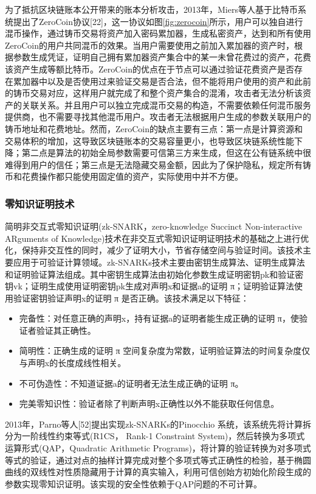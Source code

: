 为了抵抗区块链账本公开带来的账本分析攻击，2013年，Miers等人基于比特币系统提出了ZeroCoin协议[22]，这一协议如图\ref{fig:zerocoin}所示，用户可以独自进行混币操作，通过铸币交易将资产加入密码累加器，生成私密资产，达到和所有使用ZeroCoin的用户共同混币的效果。当用户需要使用之前加入累加器的资产时，根据参数生成凭证，证明自己拥有累加器资产集合中的某一未曾花费过的资产，花费该资产生成等额比特币。ZeroCoin的优点在于节点可以通过验证花费资产是否存在累加器中以及是否使用过来验证交易是否合法，但不能将用户使用的资产和此前的铸币交易对应，这样用户就完成了和整个资产集合的混淆，攻击者无法分析该资产的关联关系。并且用户可以独立完成混币交易的构造，不需要依赖任何混币服务提供商，也不需要寻找其他混币用户。攻击者无法根据用户生成的参数关联用户的铸币地址和花费地址。然而，ZeroCoin的缺点主要有三点：第一点是计算资源和交易体积的增加，这导致区块链账本的交易容量更小，也导致区块链系统性能下降；第二点是算法的初始全局参数需要可信第三方来生成，但这在公有链系统中很难得到用户的信任；第三点是无法隐藏交易金额，因此为了保护隐私，规定所有铸币和花费操作都只能使用固定值的资产，实际使用中并不方便。

\subsubsection{零知识证明技术}

简明非交互式零知识证明(zk-SNARK，zero-knowledge Succinct Non-interactive ARguments of Knowledge)技术在非交互式零知识证明证明技术的基础之上进行优化，保持非交互性的同时，减少了证明大小，节省存储空间与验证时间。该技术主要应用于可验证计算领域。zk-SNARKs技术主要由密钥生成算法、证明生成算法和证明验证算法组成。其中密钥生成算法由初始化参数生成证明密钥pk和验证密钥vk；证明生成使用证明密钥pk生成对声明x和证据a的证明 π；证明验证算法使用验证密钥验证声明x的证明 π 是否正确。该技术满足以下特征：

\begin{itemize}
	\item 完备性：对任意正确的声明x，持有证据a的证明者能生成正确的证明 π，使验证者验证其正确性。
	\item 简明性：正确生成的证明 π 空间复杂度为常数，证明验证算法的时间复杂度仅与声明x的长度成线性相关。
	\item 不可伪造性：不知道证据a的证明者无法生成正确的证明 π。
	\item 完美零知识性：验证者除了判断声明x正确性以外不能获取任何信息。
\end{itemize}

2013年，Parno等人[52]提出实现zk-SNARKs的Pinocchio 系统，该系统先将计算拆分为一阶线性约束等式(R1CS， Rank-1 Constraint System)，然后转换为多项式运算形式(QAP，Quadratic Arithmetic Programs)，将计算的验证转换为对多项式等式的验证，通过对点的抽样计算完成对整个多项式等式正确性的检验，基于椭圆曲线的双线性对性质隐藏用于计算的真实输入，利用可信创始方初始化阶段生成的参数实现零知识证明。该实现的安全性依赖于QAP问题的不可计算。

